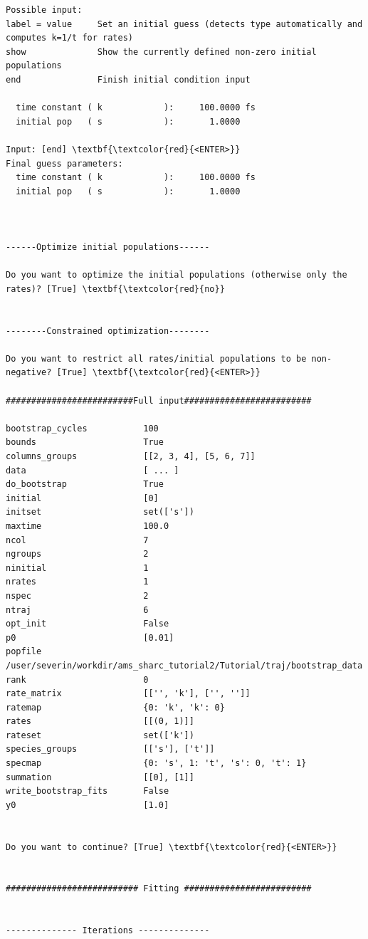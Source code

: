 \documentclass[a4paper,11pt,DIV=15,openany]{scrbook}
\begin{document}
\begin{oframed}
\begin{Verbatim}[commandchars=\\\{\}]
Possible input:
label = value     Set an initial guess (detects type automatically and computes k=1/t for rates)
show              Show the currently defined non-zero initial populations
end               Finish initial condition input

  time constant ( k            ):     100.0000 fs
  initial pop   ( s            ):       1.0000

Input: [end] \textbf{\textcolor{red}{<ENTER>}}
Final guess parameters:
  time constant ( k            ):     100.0000 fs
  initial pop   ( s            ):       1.0000



------Optimize initial populations------

Do you want to optimize the initial populations (otherwise only the rates)? [True] \textbf{\textcolor{red}{no}}


--------Constrained optimization--------

Do you want to restrict all rates/initial populations to be non-negative? [True] \textbf{\textcolor{red}{<ENTER>}}

#########################Full input#########################

bootstrap_cycles           100
bounds                     True
columns_groups             [[2, 3, 4], [5, 6, 7]]
data                       [ ... ]
do_bootstrap               True
initial                    [0]
initset                    set(['s'])
maxtime                    100.0
ncol                       7
ngroups                    2
ninitial                   1
nrates                     1
nspec                      2
ntraj                      6
opt_init                   False
p0                         [0.01]
popfile                    /user/severin/workdir/ams_sharc_tutorial2/Tutorial/traj/bootstrap_data
rank                       0
rate_matrix                [['', 'k'], ['', '']]
ratemap                    {0: 'k', 'k': 0}
rates                      [[(0, 1)]]
rateset                    set(['k'])
species_groups             [['s'], ['t']]
specmap                    {0: 's', 1: 't', 's': 0, 't': 1}
summation                  [[0], [1]]
write_bootstrap_fits       False
y0                         [1.0]


Do you want to continue? [True] \textbf{\textcolor{red}{<ENTER>}}


########################## Fitting #########################


-------------- Iterations --------------


\end{Verbatim}
\end{oframed}
\end{document}

